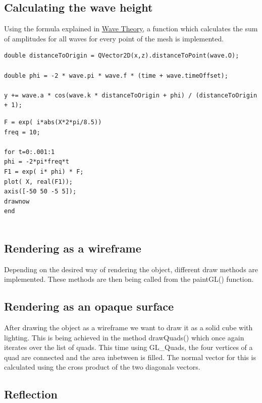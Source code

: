﻿\documentclass[12pt,a4paper]{scrartcl}
\begin{document}
\subsection{Calculating the wave height}
Using the formula explained in \hyperref[wave-theory]{Wave Theory}, a function  which calculates the sum of amplitudes for all waves for every point of the mesh is implemented.

\begin{lstlisting}[language=PSEUDO]
double distanceToOrigin = QVector2D(x,z).distanceToPoint(wave.O);

double phi = -2 * wave.pi * wave.f * (time + wave.timeOffset);

y += wave.a * cos(wave.k * distanceToOrigin + phi) / (distanceToOrigin + 1);

\end{lstlisting}


\begin{lstlisting}[language=PSEUDO]
F = exp( i*abs(X*2*pi/8.5))
freq = 10;

for t=0:.001:1
phi = -2*pi*freq*t
F1 = exp( i* phi) * F;
plot( X, real(F1));
axis([-50 50 -5 5]);
drawnow
end


\end{lstlisting}


\subsection{Rendering as a wireframe}
Depending on the desired way of rendering the object, different draw methods are implemented. These methods are then being called from the paintGL() function.

\subsection{Rendering as an opaque surface}
After drawing the object as a wireframe we want to draw it as a solid cube with lighting. This is being achieved in the method drawQuads() which once again iterates over the list of quads. This time using GL_Quads, the four vertices of a quad are connected and the area inbetween is filled. The normal vector for this is calculated using the cross product of the two diagonals vectors.

\subsection{Reflection}
\end{document}
